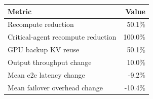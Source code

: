 \begin{tabular}{lr}
\toprule
Metric & Value \\
\midrule
Recompute reduction & 50.1\% \\
Critical-agent recompute reduction & 100.0\% \\
GPU backup KV reuse & 50.1\% \\
Output throughput change & 10.0\% \\
Mean e2e latency change & -9.2\% \\
Mean failover overhead change & -10.4\% \\
\bottomrule
\end{tabular}
